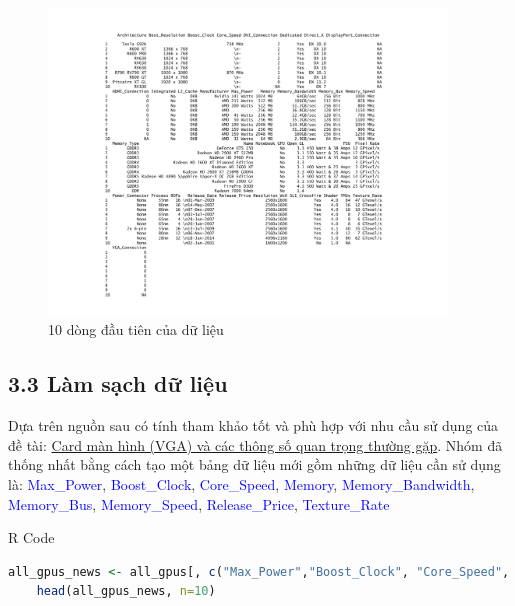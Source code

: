 \documentclass[a4paper]{article}
\newcommand{\gachdau}{\hspace*{1.5em}\ignorespaces}
\begin{document}
\newpage
            \begin{figure}[H]
                \vspace{-16pt}
                \centering
                \includegraphics[width=0.94\textwidth]{4. GPU/Console/console1.pdf}
                \caption{10 dòng đầu tiên của dữ liệu}
            \end{figure}          
       
        \subsection*{3.3 Làm sạch dữ liệu}
            \gachdau
            Dựa trên nguồn sau có tính tham khảo tốt và phù hợp với nhu cầu sử dụng của đề tài: \href{https://hoanghapc.vn/card-man-hinh-va-cac-thong-so-quan-trong-thuong-gap}{Card màn hình (VGA) và các thông số quan trọng thường gặp}. Nhóm đã thống nhất bằng cách tạo một bảng dữ liệu mới gồm những dữ liệu cần sử dụng là: \textcolor{blue}{Max\_Power}, \textcolor{blue}{Boost\_Clock}, \textcolor{blue}{Core\_Speed}, \textcolor{blue}{Memory}, \textcolor{blue}{Memory\_Bandwidth}, \textcolor{blue}{Memory\_Bus}, \textcolor{blue}{Memory\_Speed}, \textcolor{blue}{Release\_Price}, \textcolor{blue}{Texture\_Rate}
\begin{mybox}{R Code}
    \begin{lstlisting}[language={R}]
    all_gpus_news <- all_gpus[, c("Max_Power","Boost_Clock", "Core_Speed", "Memory", "Memory_Bandwidth", "Memory_Bus", "Memory_Speed", "Release_Price", "Texture_Rate")]
    head(all_gpus_news, n=10)
    \end{lstlisting}
\end{mybox}
\end{document}
